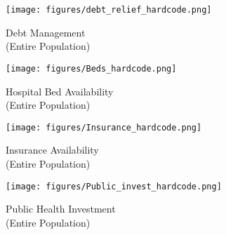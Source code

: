 \begin{figure*}[ht!]  
    \captionsetup[subfigure]{justification=centering, font=footnotesize}
  \centering
  \begin{subfigure}{0.25\textwidth}
    \texttt{[image: figures/debt\_relief\_hardcode.png]}
    \caption{Debt Management \\ (Entire Population)} \label{fig:debt_hardcode}
  \end{subfigure}%
  \begin{subfigure}{0.25\textwidth}
    \texttt{[image: figures/Beds\_hardcode.png]}
    \caption{Hospital Bed Availability \\ (Entire Population)} \label{fig:bed_hardcode}
  \end{subfigure}%
  \begin{subfigure}{0.25\textwidth}
    \texttt{[image: figures/Insurance\_hardcode.png]}
    \caption{Insurance Availability\\ (Entire Population)} \label{fig:Insurance_hardcode}
  \end{subfigure}%
  \begin{subfigure}{0.25\textwidth}
    \texttt{[image: figures/Public\_invest\_hardcode.png]}
    \caption{Public Health Investment\\ (Entire Population)} \label{fig:public_hardcode}
  \end{subfigure}%


\end{figure*}
